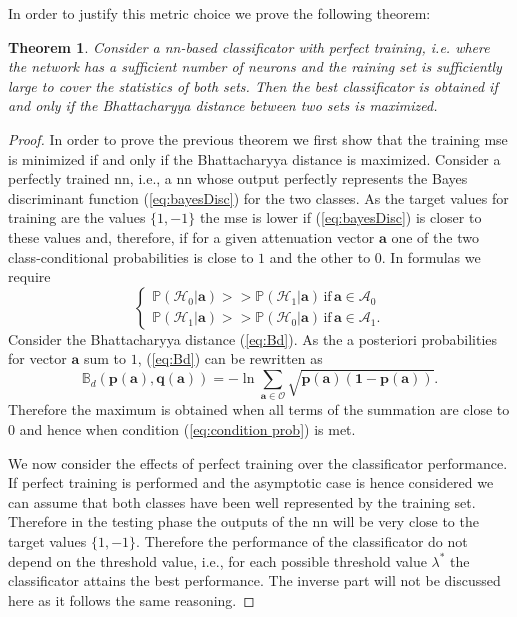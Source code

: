 \documentclass[draftcls,onecolumn,12pt]{IEEEtran}
\newtheorem{theorem}{Theorem}
\begin{document}
In order to justify this metric choice we prove the following theorem:

\begin{theorem}
Consider a \ac{nn}-based classificator with perfect training, i.e. where the network has a sufficient number of neurons and the raining set is sufficiently large to cover the statistics of both sets. Then the best classificator is obtained if and only if the Bhattacharyya distance between two sets is maximized.
\end{theorem}
\begin{proof}
In order to prove the previous theorem we first show that the training \ac{mse} is minimized if and only if the Bhattacharyya distance is maximized. Consider a perfectly trained \ac{nn}, i.e., a \ac{nn} whose output perfectly represents the Bayes discriminant function (\ref{eq:bayesDisc}) for the two classes. As the target values for training are the values $\{1,-1\}$ the \ac{mse} is lower if (\ref{eq:bayesDisc}) is closer to these values and, therefore, if for a given attenuation vector $\bm{a}$ one of the two class-conditional probabilities is close to $1$ and the other to $0$. In formulas we require 
\begin{equation}\label{eq:condition prob}
    \begin{cases}
     \mathbb{P}(\mathcal{H}_0|\bm{a}) >> \mathbb{P}(\mathcal{H}_1|\bm{a}) \, \text{if} \, \bm{a}\in\mathcal{A}_0\\
     \mathbb{P}(\mathcal{H}_1|\bm{a}) >> \mathbb{P}(\mathcal{H}_0|\bm{a}) \, \text{if} \, \bm{a}\in\mathcal{A}_1.
    \end{cases}
\end{equation}
Consider the Bhattacharyya distance (\ref{eq:Bd}). As the a posteriori probabilities for vector $\bm{a}$ sum to $1$, (\ref{eq:Bd}) can be rewritten as
\begin{equation}
    \mathbb{B}_d(\bm{p(a),q(a)}) = -\ln{\sum_{\bm{a} \in \mathcal{O}}\sqrt{\bm{p(a)(1-p(a))}}}.
\end{equation}
Therefore the maximum is obtained when all terms of the summation are close to $0$ and hence when condition (\ref{eq:condition prob}) is met.

We now consider the effects of perfect training over the classificator performance. If perfect training is performed and the asymptotic case is hence considered we can assume that both classes have been well represented by the training set. Therefore in the testing phase the outputs of the \ac{nn} will be very close to the target values $\{1,-1\}$. Therefore the performance of the classificator do not depend on the threshold value, i.e., for each possible threshold value $\lambda^*$ the classificator attains the best performance. The inverse part will not be discussed here as it follows the same reasoning.
\end{proof}
\end{document}
